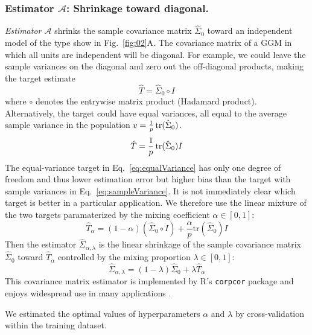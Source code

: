 \subsubsection*{Estimator $\mathcal A$: Shrinkage toward diagonal.}
\emph{Estimator $\mathcal A$} shrinks the sample covariance matrix $\hat\Sigma_0$ toward an independent model of the type show in Fig.~\ref{fig:02}A.  The covariance matrix of a GGM in which all units are independent will be diagonal.  
For example, we  could leave the sample variances on the diagonal and zero out the off-diagonal products, making the target estimate 
\begin{equation}\label{eq:sampleVariance}
\hat T= \hat\Sigma_0\circ I
\end{equation}
where $\circ$ denotes the entrywise matrix product (Hadamard product). 
Alternatively, the target could have equal variances, all equal to the average sample variance in the population $v = \frac 1 p \operatorname{tr}(\hat\Sigma_0)$.
\begin{equation}\label{eq:equalVariance}
\hat T=\frac 1 p \operatorname{tr}(\hat\Sigma_0) I
\end{equation}
The equal-variance target in Eq.~\ref{eq:equalVariance} has only one degree of freedom and thus lower estimation error but higher bias than the target with sample variances in Eq.~\ref{eq:sampleVariance}. It is not immediately clear which target is better in a particular application. We therefore use the linear mixture of the two targets paramaterized by the mixing coefficient $\alpha\in[0,1]$:
\begin{equation}
\hat T_\alpha = (1-\alpha)(\hat\Sigma_0 \circ I) + \frac \alpha p \mbox{tr}(\hat \Sigma_0)I
\end{equation}
Then the estimator $\hat\Sigma_{\alpha,\lambda}$ is the linear shrinkage of the sample covariance matrix $\hat\Sigma_0$ toward $\hat T_\alpha$ controlled by the mixing proportion $\lambda\in[0,1]$:
\begin{equation}
\hat\Sigma_{\alpha,\lambda} = (1-\lambda)\hat\Sigma_0 + \lambda\hat T_\alpha 
\end{equation}
This covariance matrix estimator is implemented by R's {\tt corpcor} package \cite{Schaefer:2010} and enjoys widespread use in many applications \cite{Schafer:2005}.

We estimated the optimal values of hyperparameters $ \alpha$ and $ \lambda$  by  cross-validation within the training dataset.  

